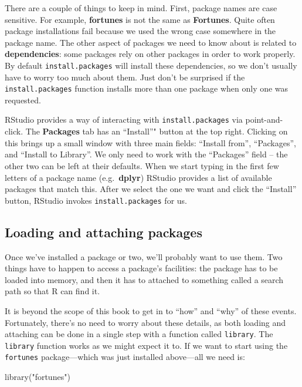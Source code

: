 \documentclass[
]{book}
\newenvironment{Shaded}{\begin{snugshade}}{\end{snugshade}}
\newcommand{\FunctionTok}[1]{\textcolor[rgb]{0.00,0.00,0.00}{#1}}
\newcommand{\NormalTok}[1]{#1}
\newcommand{\StringTok}[1]{\textcolor[rgb]{0.31,0.60,0.02}{#1}}
\begin{document}
There are a couple of things to keep in mind. First, package names are case sensitive. For example, \textbf{fortunes} is not the same as \textbf{Fortunes}. Quite often package installations fail because we used the wrong case somewhere in the package name. The other aspect of packages we need to know about is related to \textbf{dependencies}: some packages rely on other packages in order to work properly. By default \texttt{install.packages} will install these dependencies, so we don't usually have to worry too much about them. Just don't be surprised if the \texttt{install.packages} function installs more than one package when only one was requested.

RStudio provides a way of interacting with \texttt{install.packages} via point-and-click. The \textbf{Packages} tab has an ``Install''" button at the top right. Clicking on this brings up a small window with three main fields: ``Install from'', ``Packages'', and ``Install to Library''. We only need to work with the ``Packages'' field -- the other two can be left at their defaults. When we start typing in the first few letters of a package name (e.g.~\textbf{dplyr}) RStudio provides a list of available packages that match this. After we select the one we want and click the ``Install'' button, RStudio invokes \texttt{install.packages} for us.

\hypertarget{loading-and-attaching-packages}{%
\subsection{Loading and attaching packages}\label{loading-and-attaching-packages}}

Once we've installed a package or two, we'll probably want to use them. Two things have to happen to access a package's facilities: the package has to be loaded into memory, and then it has to attached to something called a search path so that R can find it.

It is beyond the scope of this book to get in to ``how'' and ``why'' of these events. Fortunately, there's no need to worry about these details, as both loading and attaching can be done in a single step with a function called \texttt{library}. The \texttt{library} function works as we might expect it to. If we want to start using the \texttt{fortunes} package---which was just installed above---all we need is:

\begin{Shaded}
\begin{Highlighting}[]
\FunctionTok{library}\NormalTok{(}\StringTok{"fortunes"}\NormalTok{)}
\end{Highlighting}
\end{Shaded}
\end{document}
